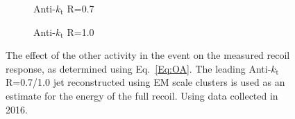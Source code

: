 \begin{figure}[!ht]
  \centering
  \begin{subfigure}{.5\textwidth}
    \centering
    \caption{Anti-$k_\mathrm{t}$ R=0.7}
  \end{subfigure}%
  \begin{subfigure}{.5\textwidth}  \centering
    \caption{Anti-$k_\mathrm{t}$ R=1.0}
  \end{subfigure}
  \caption[$\Delta^{\mathrm{OA}}$ using Anti-$k_\mathrm{t}$ R=0.7/1.0 jets]
{\small The effect of the other activity in the event on the measured recoil response, as determined using Eq.~\ref{Eq:OA}.  The leading Anti-$k_\mathrm{t}$ R=0.7/1.0 jet reconstructed using EM scale clusters is used as an estimate for the energy of the full recoil.  Using data collected in 2016.  }
  \label{Fig:OA_7-10}
\end{figure}




